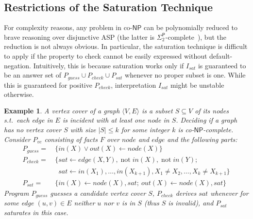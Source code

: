 \documentclass[11pt,fleqn,twoside]{article}
\def\naf{\ensuremath{\mathop{not}}}
\newcommand{\p}{\ensuremath{\mathsf{P}}\xspace}
\newcommand{\conp}{co-\ensuremath{\mathsf{NP}}\xspace}
\newtheorem{example}{Example}
\begin{document}
		\subsection{Restrictions of the Saturation Technique}
		\label{sec:restrictions}

			For complexity reasons, any problem in \conp can be polynomially reduced to brave reasoning over disjunctive ASP (the latter is $\Sigma^{\p}_2$-complete~\cite{flp2011-ai}),
			but the reduction is not always obvious. In particular, the saturation technique is difficult to apply if the property to check cannot be easily expressed without default-negation.
			Intuitively, this is because saturation works only if $I_{\mathit{sat}}$ is guaranteed to be an answer set of $P_{\mathit{guess}} \cup P_{\mathit{check}} \cup P_{\mathit{sat}}$ whenever no proper subset is one.
			While this is guaranteed for positive $P_{\mathit{check}}$, interpretation $I_{\mathit{sat}}$ might be unstable otherwise.
			
			\begin{example}
				\label{ex:vertexcover}
				A \emph{vertex cover} of a graph $\langle V, E \rangle$ is a subset $S \subseteq V$ of its nodes s.t.~each edge in $E$ is incident with at least one node in $S$.
				Deciding if a graph has \emph{no} vertex cover $S$ with size $|S| \leq k$ for some integer $k$ is \conp-complete.
				Consider $P_{\mathit{vc}}$ consisting of facts $F$ over $\mathit{node}$ and $\mathit{edge}$ and the following parts:
				{
				\begin{align*}
					P_{\mathit{guess}} = & \ \{ \mathit{in}(X) \vee \mathit{out}(X) \leftarrow \mathit{node}(X) \} \\
					P_{\mathit{check}} = & \ \{ \mathit{sat} \leftarrow \mathit{edge}(X,Y), \naf \mathit{in}(X), \naf \mathit{in}(Y); \\
										 & \ \phantom{\{}
										\mathit{sat} \leftarrow \mathit{in}(X_1), \ldots, \mathit{in}(X_{k+1}), X_1 \not= X_2, \ldots, X_k \not= X_{k+1} \} \\
					P_{\mathit{sat}} = & \ \{ \mathit{in}(X) \leftarrow \mathit{node}(X), \mathit{sat}; \ \mathit{out}(X) \leftarrow \mathit{node}(X), \mathit{sat} \}
				\end{align*}			
				}
				Program $P_{\mathit{guess}}$ guesses a candidate vertex cover $S$, $P_{\mathit{check}}$ derives $\mathit{sat}$ whenever for some edge $(u,v) \in E$ neither $u$ nor $v$ is in $S$ (thus $S$ is invalid),
				and $P_{\mathit{sat}}$ saturates in this case.
			\end{example}
\end{document}
